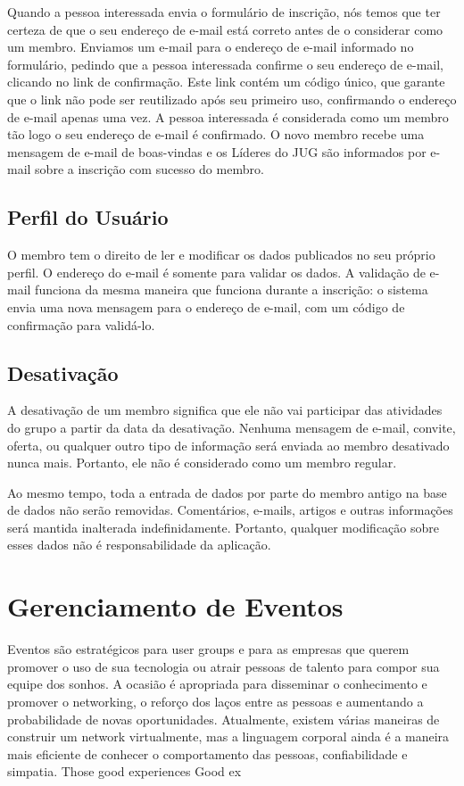 \documentclass[envcountsame,envcountchap,letterpaper]{svmono}
\begin{document}
Quando a pessoa interessada envia o formulário de inscrição, nós temos que ter certeza de que o seu endereço de e-mail está correto antes de o considerar como um membro. Enviamos um e-mail para o endereço de e-mail informado no formulário, pedindo que a pessoa interessada confirme o seu endereço de e-mail, clicando no link de confirmação. Este link contém um código único, que garante que o link não pode ser reutilizado após seu primeiro uso, confirmando o endereço de e-mail apenas uma vez. A pessoa interessada é considerada como um membro tão logo o seu endereço de e-mail é confirmado. O novo membro recebe uma mensagem de e-mail de boas-vindas e os Líderes do JUG são informados por e-mail sobre a inscrição com sucesso do membro.

\section{Perfil do Usuário}

O membro tem o direito de ler e modificar os dados publicados no seu próprio perfil. O endereço do e-mail é somente para validar os dados. A validação de e-mail funciona da mesma maneira que funciona durante a inscrição: o sistema envia uma nova mensagem para o endereço de e-mail, com um código de confirmação para validá-lo.

\section{Desativação}

A desativação de um membro significa que ele não vai participar das atividades do grupo a partir da data da desativação. Nenhuma mensagem de e-mail, convite, oferta, ou qualquer outro tipo de informação será enviada ao membro desativado nunca mais. Portanto, ele não é considerado como um membro regular.

Ao mesmo tempo, toda a entrada de dados por parte do membro antigo na base de dados não serão removidas. Comentários, e-mails, artigos e outras informações será mantida inalterada indefinidamente. Portanto, qualquer modificação sobre esses dados não é responsabilidade da aplicação.

\chapter{Gerenciamento de Eventos}
\label{chp:event-management}

Eventos são estratégicos para user groups e para as empresas que querem promover o uso de sua tecnologia ou atrair pessoas de talento para compor sua equipe dos sonhos. A ocasião é apropriada para disseminar o conhecimento e promover o networking, o reforço dos laços entre as pessoas e aumentando a probabilidade de novas oportunidades. Atualmente, existem várias maneiras de construir um network virtualmente, mas a linguagem corporal ainda é a maneira mais eficiente de conhecer o comportamento das pessoas, confiabilidade e simpatia. Those good experiences Good ex
\end{document}
